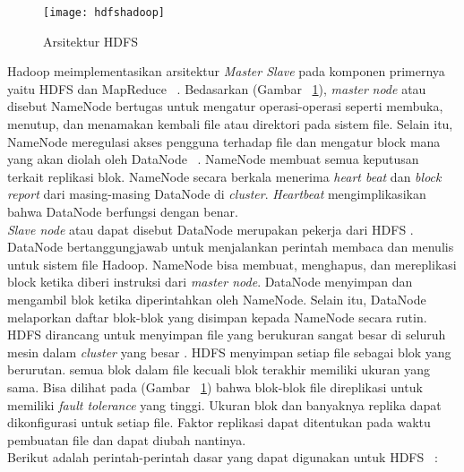 \begin{figure}[H]
    \centering  
    \texttt{[image: hdfshadoop]}  
    \caption[Arsitektur HDFS]{Arsitektur HDFS} 
    \label{fig:hdfshadoop} 
\end{figure}

Hadoop meimplementasikan arsitektur {\it Master Slave} pada komponen primernya yaitu HDFS dan MapReduce ~\cite{tomwhite:05:htdg}. Bedasarkan  (Gambar ~\ref{fig:hdfshadoop}), \textit{master} \textit{node} atau disebut NameNode bertugas untuk mengatur operasi-operasi seperti membuka, menutup, dan menamakan kembali file atau direktori pada sistem file. Selain itu, NameNode meregulasi akses pengguna terhadap file dan mengatur block mana yang akan diolah oleh DataNode ~\cite{tomwhite:05:htdg}. NameNode membuat semua keputusan terkait replikasi blok. NameNode secara berkala menerima \textit{heart beat} dan \textit{block report} dari masing-masing DataNode di {\it cluster}. \textit{Heartbeat} mengimplikasikan bahwa DataNode berfungsi dengan benar.\\
	
{\it Slave node} atau dapat disebut DataNode merupakan pekerja dari HDFS \cite{tomwhite:05:htdg}. DataNode bertanggungjawab untuk menjalankan perintah membaca dan menulis untuk sistem file Hadoop. NameNode bisa membuat, menghapus, dan mereplikasi block ketika diberi instruksi dari {\it master node}. DataNode menyimpan dan mengambil blok ketika diperintahkan oleh NameNode. Selain itu, DataNode melaporkan daftar blok-blok yang disimpan kepada NameNode secara rutin.\\ 

HDFS dirancang untuk menyimpan file yang berukuran sangat besar di seluruh mesin dalam {\it cluster} yang besar \cite{tomwhite:05:htdg}. HDFS menyimpan setiap file sebagai blok yang berurutan. semua blok dalam file kecuali blok terakhir memiliki ukuran yang sama. Bisa dilihat pada (Gambar ~\ref{fig:hdfshadoop}) bahwa blok-blok file direplikasi untuk memiliki {\it fault tolerance} yang tinggi. Ukuran blok dan banyaknya replika dapat dikonfigurasi untuk setiap file. Faktor replikasi dapat ditentukan pada waktu pembuatan file dan dapat diubah nantinya.\\

Berikut adalah perintah-perintah dasar yang dapat digunakan untuk HDFS ~\cite{chucklam:06:hia}:

